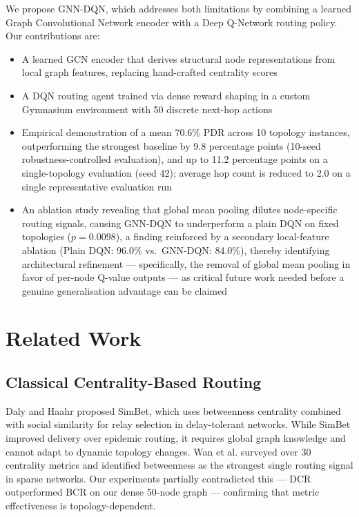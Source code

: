 \documentclass[conference]{IEEEtran}
\begin{document}
We propose GNN-DQN, which addresses both limitations by combining
a learned Graph Convolutional Network encoder with a Deep
Q-Network routing policy. Our contributions are:
\begin{itemize}
    \item A learned GCN encoder that derives structural node
    representations from local graph features, replacing
    hand-crafted centrality scores
    \item A DQN routing agent trained via dense reward shaping
    in a custom Gymnasium environment with 50 discrete
    next-hop actions
    \item Empirical demonstration of a mean 70.6\% PDR across 10
    topology instances, outperforming the strongest baseline by
    9.8 percentage points (10-seed robustness-controlled
    evaluation), and up to 11.2 percentage points on a
    single-topology evaluation (seed 42); average hop count is
    reduced to 2.0 on a single representative evaluation run
    \item An ablation study revealing that global mean pooling
    dilutes node-specific routing signals, causing GNN-DQN to
    underperform a plain DQN on fixed topologies ($p=0.0098$),
    a finding reinforced by a secondary local-feature ablation
    (Plain DQN: 96.0\% vs.\ GNN-DQN: 84.0\%), thereby
    identifying architectural refinement — specifically, the
    removal of global mean pooling in favor of per-node Q-value
    outputs — as critical future work needed before a genuine
    generalisation advantage can be claimed
\end{itemize}

\section{Related Work}

\subsection{Classical Centrality-Based Routing}
Daly and Haahr \cite{daly2007} proposed SimBet, which uses
betweenness centrality combined with social similarity for relay
selection in delay-tolerant networks. While SimBet improved
delivery over epidemic routing, it requires global graph knowledge
and cannot adapt to dynamic topology changes. Wan et al.
\cite{wan2021} surveyed over 30 centrality metrics and identified
betweenness as the strongest single routing signal in sparse
networks. Our experiments partially contradicted this — DCR
outperformed BCR on our dense 50-node graph — confirming
that metric effectiveness is topology-dependent.
\end{document}
